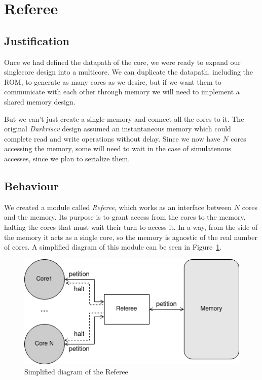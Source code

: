 \section{Referee}

\subsection{Justification} \label{referee-justification}
Once we had defined the datapath of the core, we were ready to expand our singlecore design into a multicore.
We can duplicate the datapath, including the ROM, to generate as many cores as we desire, but if we want them to communicate with each other through memory we will need to implement a shared memory design.

But we can't just create a single memory and connect all the cores to it.
The original \textit{Darkriscv} design assumed an instantaneous memory which could complete read and write operations without delay.
Since we now have $N$ cores accessing the memory, some will need to wait in the case of simulatenous accesses, since we plan to serialize them.


\subsection{Behaviour} \label{referee-behaviour}
We created a module called \textit{Referee}, which works as an interface between $N$ cores and the memory.
Its purpose is to grant access from the cores to the memory, halting the cores that must wait their turn to access it.
In a way, from the side of the memory it acts as a single core, so the memory is agnostic of the real number of cores.
A simplified diagram of this module can be seen in Figure~\ref{referee-fig}.

\begin{figure}[h!]
    \centering
    \includegraphics[width=.6\textwidth]{images/Referee_fig.png}
    \caption{Simplified diagram of the Referee}
    \label{referee-fig}
\end{figure}

